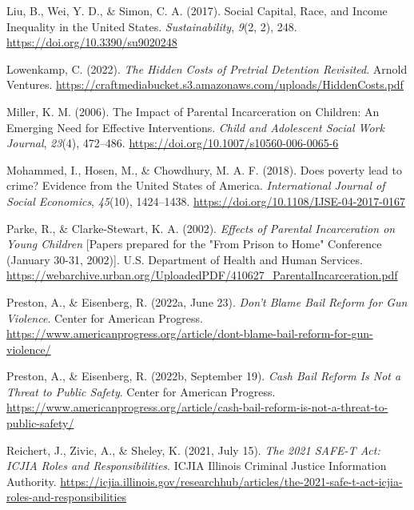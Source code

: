 \documentclass[
  letterpaper,
  DIV=11,
  numbers=noendperiod]{scrartcl}
\newlength{\cslhangindent}
\newlength{\cslentryspacingunit} %
\newenvironment{CSLReferences}[2] %
 {%
  \setlength{\parindent}{0pt}
  \ifodd #1
  \let\oldpar\par
  \def\par{\hangindent=\cslhangindent\oldpar}
  \fi
  \setlength{\parskip}{#2\cslentryspacingunit}
 }%
 {}
\begin{document}
\begin{CSLReferences}{1}{0}
\leavevmode{}%
Liu, B., Wei, Y. D., \& Simon, C. A. (2017). Social {Capital}, {Race},
and {Income Inequality} in the {United States}. \emph{Sustainability},
\emph{9}(2, 2), 248. \url{https://doi.org/10.3390/su9020248}

\leavevmode{}%
Lowenkamp, C. (2022). \emph{The {Hidden Costs} of {Pretrial Detention
Revisited}}. {Arnold Ventures}.
\url{https://craftmediabucket.s3.amazonaws.com/uploads/HiddenCosts.pdf}

\leavevmode{}%
Miller, K. M. (2006). The {Impact} of {Parental Incarceration} on
{Children}: {An Emerging Need} for {Effective Interventions}.
\emph{Child and Adolescent Social Work Journal}, \emph{23}(4), 472--486.
\url{https://doi.org/10.1007/s10560-006-0065-6}

\leavevmode{}%
Mohammed, I., Hosen, M., \& Chowdhury, M. A. F. (2018). Does poverty
lead to crime? {Evidence} from the {United States} of {America}.
\emph{International Journal of Social Economics}, \emph{45}(10),
1424--1438. \url{https://doi.org/10.1108/IJSE-04-2017-0167}

\leavevmode{}%
Parke, R., \& Clarke-Stewart, K. A. (2002). \emph{Effects of {Parental
Incarceration} on {Young Children}} {[}Papers prepared for the "From
Prison to Home" Conference (January 30-31, 2002){]}. {U.S. Department of
Health and Human Services}.
\url{https://webarchive.urban.org/UploadedPDF/410627_ParentalIncarceration.pdf}

\leavevmode{}%
Preston, A., \& Eisenberg, R. (2022a, June 23). \emph{Don't {Blame Bail
Reform} for {Gun Violence}}. {Center for American Progress}.
\url{https://www.americanprogress.org/article/dont-blame-bail-reform-for-gun-violence/}

\leavevmode{}%
Preston, A., \& Eisenberg, R. (2022b, September 19). \emph{Cash {Bail
Reform Is Not} a {Threat} to {Public Safety}}. {Center for American
Progress}.
\url{https://www.americanprogress.org/article/cash-bail-reform-is-not-a-threat-to-public-safety/}

\leavevmode{}%
Reichert, J., Zivic, A., \& Sheley, K. (2021, July 15). \emph{The 2021
{SAFE-T Act}: {ICJIA Roles} and {Responsibilities}}. {ICJIA \textbar{}
Illinois Criminal Justice Information Authority}.
\url{https://icjia.illinois.gov/researchhub/articles/the-2021-safe-t-act-icjia-roles-and-responsibilities}


\end{CSLReferences}
\end{document}
